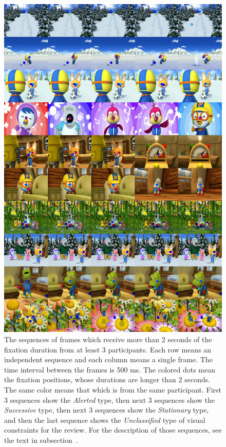 \documentclass[10pt,letterpaper]{article}
\begin{document}
\begin{figure}
  \centerline{\includegraphics[width=120mm]{./eps/long_fixations_types.png}}
  \caption{The sequences of frames which receive more than 2 seconds of the fixation duration from at least 3 participants. Each row means an independent sequence and each column means a single frame. The time interval between the frames is 500 ms. The colored dots mean the fixation positions, whose durations are longer than 2 seconds. The same color means that which is from the same participant. First 3 sequences show the \textit{Alerted} type, then next 3 sequences show the \textit{Successive} type, then next 3 sequences show the \textit{Stationary} type, and then the last sequence shows the \textit{Unclassified} type of visual constraints for the review. For the description of those sequences, see the text in subsection~\textit{}.}
  \label{fig:long-fixations}
\end{figure}
\end{document}
